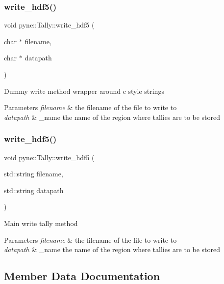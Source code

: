 \subsubsection{\texorpdfstring{write\+\_\+hdf5()}{write\_hdf5()}\hspace{0.1cm}{\footnotesize\ttfamily [1/2]}}
{\footnotesize\ttfamily void pyne\+::\+Tally\+::write\+\_\+hdf5 (\begin{DoxyParamCaption}\item[{char $\ast$}]{filename,  }\item[{char $\ast$}]{datapath }\end{DoxyParamCaption})}

Dummy write method wrapper around c style strings 
\begin{DoxyParams}{Parameters}
{\em filename} & the filename of the file to write to \\
\hline
{\em datapath} & \+\_\+name the name of the region where tallies are to be stored \\
\hline
\end{DoxyParams}
\mbox{\label{classpyne_1_1_tally_abc2ff249b426b47b2beb1bfeeacbbe62}} 
\subsubsection{\texorpdfstring{write\+\_\+hdf5()}{write\_hdf5()}\hspace{0.1cm}{\footnotesize\ttfamily [2/2]}}
{\footnotesize\ttfamily void pyne\+::\+Tally\+::write\+\_\+hdf5 (\begin{DoxyParamCaption}\item[{std\+::string}]{filename,  }\item[{std\+::string}]{datapath }\end{DoxyParamCaption})}

Main write tally method 
\begin{DoxyParams}{Parameters}
{\em filename} & the filename of the file to write to \\
\hline
{\em datapath} & \+\_\+name the name of the region where tallies are to be stored \\
\hline
\end{DoxyParams}


\subsection{Member Data Documentation}
\mbox{\label{classpyne_1_1_tally_a8b2e517c759ca71bc7b25c4de5a412f9}} 
